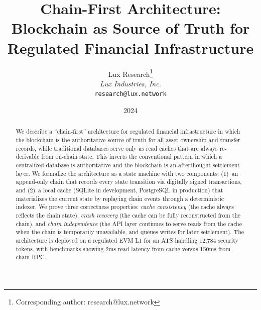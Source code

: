 \documentclass[11pt,a4paper]{article}
\title{Chain-First Architecture:\\Blockchain as Source of Truth for\\Regulated Financial Infrastructure}
\author{
Lux Research\thanks{Corresponding author: research@lux.network}\\
\textit{Lux Industries, Inc.}\\
\texttt{research@lux.network}
}
\date{2024}
\begin{document}
\luxcoverpage

\begin{abstract}
We describe a ``chain-first'' architecture for regulated financial
infrastructure in which the blockchain is the authoritative source of
truth for all asset ownership and transfer records, while traditional
databases serve only as read caches that are always re-derivable from
on-chain state.  This inverts the conventional pattern in which a
centralized database is authoritative and the blockchain is an
afterthought settlement layer.  We formalize the architecture as a
state machine with two components: (1)~an append-only chain that
records every state transition via digitally signed transactions, and
(2)~a local cache (SQLite in development, PostgreSQL in production)
that materializes the current state by replaying chain events through
a deterministic indexer.  We prove three correctness properties:
\emph{cache consistency} (the cache always reflects the chain state),
\emph{crash recovery} (the cache can be fully reconstructed from the
chain), and \emph{chain independence} (the API layer continues to
serve reads from the cache when the chain is temporarily unavailable,
and queues writes for later settlement).  The architecture is deployed
on a regulated EVM L1 for an ATS handling
12,784 security tokens, with benchmarks showing 2ms read latency from
cache versus 150ms from chain RPC.
\end{abstract}

\tableofcontents
\newpage










\end{document}

